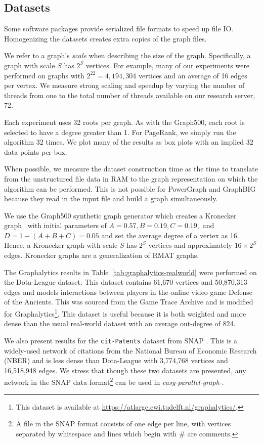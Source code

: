 \documentclass[conference]{IEEEtran}
\begin{document}
\subsection{Datasets}
Some software packages provide serialized file formats to speed up file IO. Homogenizing the datasets creates extra copies of the graph files.

We refer to a graph's \emph{scale} when describing the size of the graph. Specifically, a graph with scale $S$ has $2^S$ vertices. For example, many of our experiments were performed on graphs with $2^{22} = 4,194,304$ vertices and an average of 16 edges per vertex. We measure strong scaling and speedup by varying the number of threads from one to the total number of threads available on our research server, 72.

Each experiment uses 32 roots per graph. As with the Graph500, each root is selected to have a degree greater than 1. For PageRank, we simply run the algorithm 32 times. We plot many of the results as box plots with an implied 32 data points per box.

When possible, we measure the dataset construction time as the time to translate from the unstructured file data in RAM to the graph representation on which the algorithm can be performed. This is not possible for PowerGraph and GraphBIG because they read in the input file and build a graph simultaneously.

We use the Graph500 synthetic graph generator which creates a Kronecker graph~\cite{Leskovec:2010:Kronecker} with initial parameters of $A = 0.57, B = 0.19, C = 0.19,$ and $D = 1-(A+B+C) = 0.05$ and set the average degree of a vertex as 16. Hence, a Kronecker graph with scale $S$ has $2^S$ vertices and approximately $16 \times 2^S$ edges. Kronecker graphs are a generalization of RMAT graphs.

The Graphalytics results in Table~\ref{tab:graphalytics-realworld} were performed on the Dota-League dataset. This dataset contains 61,670 vertices and 50,870,313 edges and models interactions between players in the online video game Defense of the Ancients. This was sourced from the Game Trace Archive\cite{Guo:2012:GTA} and is modified for Graphalytics\footnote{This dataset is available at \url{https://atlarge.ewi.tudelft.nl/graphalytics/}.}. This dataset is useful because it is both weighted and more dense than the usual real-world dataset with an average out-degree of 824.

We also present results for the \verb|cit-Patents| dataset from SNAP \cite{snap-cit-patents}. This is a widely-used network of citations from the National Bureau of Economic Research (NBER) and is less dense than Dota-League with 3,774,768 vertices and 16,518,948 edges. We stress that though these two datasets are presented, any network in the SNAP data format\footnote{A file in the SNAP format consists of one edge per line, with vertices separated by whitespace and lines which begin with \# are comments.} can be used in \mbox{\emph{easy-parallel-graph-\textasteriskcentered}}.
\end{document}
